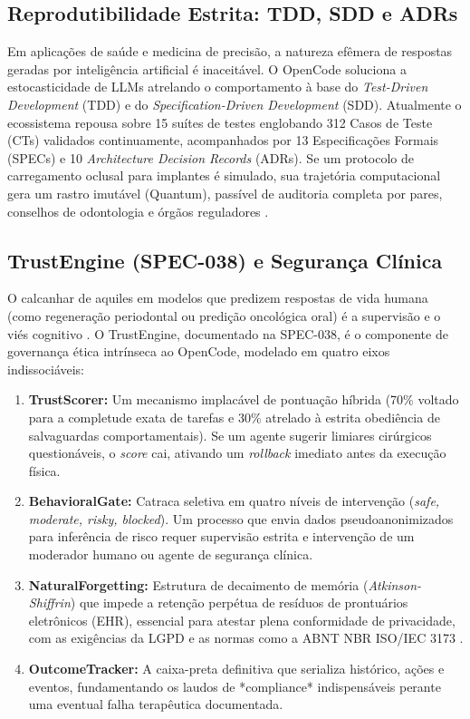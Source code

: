 
\subsection{Reprodutibilidade Estrita: TDD, SDD e ADRs}
Em aplicações de saúde e medicina de precisão, a natureza efêmera de respostas geradas por inteligência artificial é inaceitável. O OpenCode soluciona a estocasticidade de LLMs atrelando o comportamento à base do \textit{Test-Driven Development} (TDD) e do \textit{Specification-Driven Development} (SDD). Atualmente o ecossistema repousa sobre 15 suítes de testes englobando 312 Casos de Teste (CTs) validados continuamente, acompanhados por 13 Especificações Formais (SPECs) e 10 \textit{Architecture Decision Records} (ADRs). Se um protocolo de carregamento oclusal para implantes é simulado, sua trajetória computacional gera um rastro imutável (Quantum), passível de auditoria completa por pares, conselhos de odontologia e órgãos reguladores \cite{digital2026applications}.

\subsection{TrustEngine (SPEC-038) e Segurança Clínica}
O calcanhar de aquiles em modelos que predizem respostas de vida humana (como regeneração periodontal ou predição oncológica oral) é a supervisão e o viés cognitivo \cite{realising2026digital}. O TrustEngine, documentado na SPEC-038, é o componente de governança ética intrínseca ao OpenCode, modelado em quatro eixos indissociáveis:

\begin{enumerate}
    \item \textbf{TrustScorer:} Um mecanismo implacável de pontuação híbrida (70\% voltado para a completude exata de tarefas e 30\% atrelado à estrita obediência de salvaguardas comportamentais). Se um agente sugerir limiares cirúrgicos questionáveis, o \textit{score} cai, ativando um \textit{rollback} imediato antes da execução física.
    \item \textbf{BehavioralGate:} Catraca seletiva em quatro níveis de intervenção (\textit{safe, moderate, risky, blocked}). Um processo que envia dados pseudoanonimizados para inferência de risco requer supervisão estrita e intervenção de um moderador humano ou agente de segurança clínica.
    \item \textbf{NaturalForgetting:} Estrutura de decaimento de memória (\textit{Atkinson-Shiffrin}) que impede a retenção perpétua de resíduos de prontuários eletrônicos (EHR), essencial para atestar plena conformidade de privacidade, com as exigências da LGPD e as normas como a ABNT NBR ISO/IEC 3173 \cite{frota2025sus}.
    \item \textbf{OutcomeTracker:} A caixa-preta definitiva que serializa histórico, ações e eventos, fundamentando os laudos de *compliance* indispensáveis perante uma eventual falha terapêutica documentada.
\end{enumerate}
